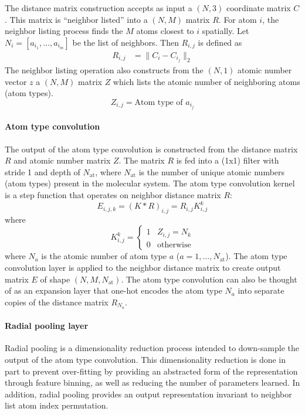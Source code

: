 The distance matrix construction accepts as input a $(N,3)$ coordinate matrix $C$. This matrix is ``neighbor listed'' into a $(N,M)$ matrix $R$. For atom $i$, the neighbor listing process finds the $M$ atoms closest to $i$ spatially. Let $N_i = [a_{i_1},\dotsc,a_{i_m}]$ be the list of neighbors. Then $R_{i,j}$ is defined as
\begin{eqnarray*}
R_{i,j} &= \|C_i - C_{i_j}\|_2
\end{eqnarray*}
The neighbor listing operation also constructs from the $(N,1)$ atomic number vector $z$ a $(N,M)$ matrix $Z$ which lists the atomic number of neighboring atoms (atom types).
\begin{equation*}
Z_{i,j} = \textrm{Atom type of }a_{i_j}
\end{equation*}

\paragraph{Atom type convolution} 
The output of the atom type convolution is constructed from the distance matrix $R$ and atomic number matrix $Z$. The matrix $R$ is fed into a (1x1) filter with stride 1 and depth of $N_\textrm{at}$, where $N_\textrm{at}$ is the number of unique atomic numbers (atom types) present in the molecular system.  The atom type convolution kernel is a step function that operates on neighbor distance matrix $R$:
\begin{equation*}
E_{i, j, k} = (K*R)_{i, j} = R_{i,j}K_{i,j}^k
\end{equation*}
where 
\begin{equation*}
K_{i,j}^k = \begin{cases} 
      1 & Z_{i,j} = N_k \\
      0 & \textrm{otherwise}
   \end{cases}
\end{equation*}
where $N_a$ is the atomic number of atom type $a$ ($a = 1,\dotsc,N_\textrm{at}$).  The atom type convolution layer is applied to the neighbor distance matrix to create output matrix $E$ of shape $(N, M, N_\textrm{at})$. The atom type convolution can also be thought of as an expansion layer that one-hot encodes the atom type $N_{a}$ into separate copies of the distance matrix $R_{N_{a}}$.
\paragraph{Radial pooling layer}
Radial pooling is a dimensionality reduction process intended to down-sample the output of the atom type convolution. This dimensionality reduction is done in part to prevent over-fitting by providing an abstracted form of the representation through feature binning, as well as reducing the number of parameters learned.  In addition, radial pooling provides an output representation invariant to neighbor list atom index permutation.  

